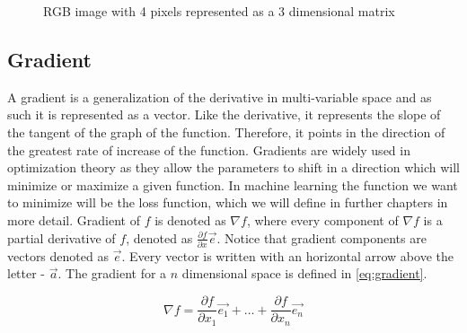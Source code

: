 \documentclass[times, utf8, diplomski]{fer}
\begin{document}
\begin{figure}
\centering
{}
\caption{RGB image with 4 pixels  represented as a 3 dimensional matrix}
\label{fig:image_matrix}
\end{figure}

\subsection{Gradient}
\label{se:gradient}
A gradient is a generalization of the derivative in multi-variable space and as such it is represented as a vector. Like the derivative, it represents the slope of the tangent of the graph of the function. Therefore, it points in the direction of the greatest rate of increase of the function. Gradients are widely used in optimization theory as they allow the parameters to shift in a direction which will minimize or maximize a given function. In machine learning the function we want to minimize will be the loss function, which we will define in further chapters in more detail. Gradient of $f$ is denoted as $\nabla{f}$, where every component of $\nabla{f}$ is a partial derivative of $f$, denoted as $\frac{\partial{f}}{\partial{x}}\vec{e}$. Notice that gradient components are vectors denoted as $\vec{e}$. Every vector is written with an horizontal arrow above the letter - $\vec{a}$. The gradient for a $n$ dimensional space is defined in \ref{eq:gradient}.


\begin{equation} \label{eq:gradient}
    \nabla{f}= \frac{\partial{f}}{\partial{x_{1}}}\vec{e_1} + \hdots + 	   \frac{\partial{f}}{\partial{x_{n}}}\vec{e_n}
\end{equation}
\end{document}
